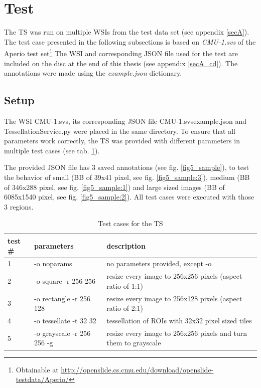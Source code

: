 \section{Test}
\label{sec5_test}
The TS was run on multiple WSIs from the test data set (see appendix \ref{secA}). The test case presented in the following subsections is based on \emph{CMU-1.svs} of the Aperio test set\footnote{
	Obtainable at \url{http://openslide.cs.cmu.edu/download/openslide-testdata/Aperio/}
} The WSI and corresponding JSON file used for the test are included on the disc at the end of this thesis (see appendix \ref{secA_cd}). The annotations were made using the \emph{example.json} dictionary.


\subsection{Setup}
\label{sec5_testSetup}
The WSI CMU-1.svs, its corresponding JSON file CMU-1.svs{\textunderscore}example.json and TessellationService.py were placed in the same directory. To ensure that all parameters work correctly, the TS was provided with different parameters in multiple test cases (see tab. \ref{tab5_tests}).

The provided JSON file has 3 saved annotations (see fig. \ref{fig5_sample}), to test the behavior of small (BB of 39x41 pixel, see fig. \ref{fig5_sample:3}), medium (BB of 346x288 pixel, see fig. \ref{fig5_sample:1}) and large sized images (BB of 6085x1540 pixel, see fig. \ref{fig5_sample:2}). All test cases were executed with those 3 regions.

\begin{table}[H]
	\begin{center}
		\begin{tabular}{| p{1.5cm} | p{3cm} |  p{5.5cm} |}
			\hline
			\textbf{test \#} & \textbf{parameters} & \textbf{description}\\ \hline
			1 & -o noparams & no parameters provided, except -o \\ \hline
			2 & -o square -r 256 256 & resize every image to 256x256 pixels (aspect ratio of 1:1)\\ \hline
			3 & -o rectangle -r 256 128 & resize every image to 256x128 pixels (aspect ratio of 2:1) \\ \hline
			4 & -o tessellate -t 32 32 & tessellation of ROIs with 32x32 pixel sized tiles \\ \hline
			5 & -o grayscale -r 256 256 -g & resize every image to 256x256 pixels and turn them to grayscale\\ \hline
		\end{tabular}
		\caption{Test cases for the TS}
		\label{tab5_tests}
	\end{center}
\end{table}


